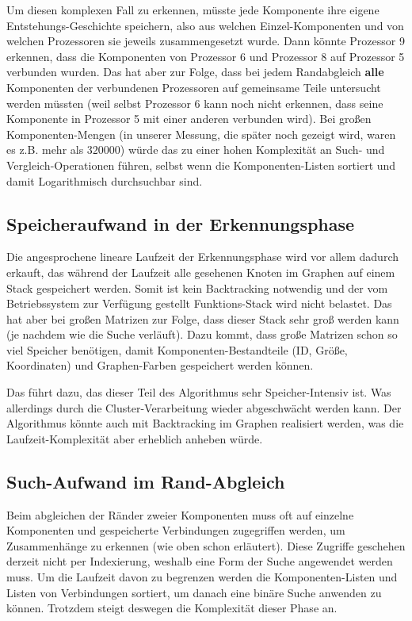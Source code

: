 Um diesen komplexen Fall zu erkennen, müsste jede Komponente ihre eigene Entstehungs-Geschichte speichern, also aus welchen Einzel-Komponenten und von welchen Prozessoren sie jeweils zusammengesetzt wurde. Dann könnte Prozessor 9 erkennen, dass die Komponenten von Prozessor 6 und Prozessor 8 auf Prozessor 5 verbunden wurden. Das hat aber zur Folge, dass bei jedem Randabgleich \textbf{alle} Komponenten der verbundenen Prozessoren auf gemeinsame Teile untersucht werden müssten (weil selbst Prozessor 6 kann noch nicht erkennen, dass seine Komponente in Prozessor 5 mit einer anderen verbunden wird). Bei großen Komponenten-Mengen (in unserer Messung, die später noch gezeigt wird, waren es z.B. mehr als $320000$) würde das zu einer hohen Komplexität an Such- und Vergleich-Operationen führen, selbst wenn die Komponenten-Listen sortiert und damit Logarithmisch durchsuchbar sind.

\subsection{Speicheraufwand in der Erkennungsphase}

Die angesprochene lineare Laufzeit der Erkennungsphase wird vor allem dadurch erkauft, das während der Laufzeit alle gesehenen Knoten im Graphen auf einem Stack gespeichert werden. Somit ist kein Backtracking notwendig und der vom Betriebssystem zur Verfügung gestellt Funktions-Stack wird nicht belastet. Das hat aber bei großen Matrizen zur Folge, dass dieser Stack sehr groß werden kann (je nachdem wie die Suche verläuft). Dazu kommt, dass große Matrizen schon so viel Speicher benötigen, damit Komponenten-Bestandteile (ID, Größe, Koordinaten) und Graphen-Farben gespeichert werden können.

Das führt dazu, das dieser Teil des Algorithmus sehr Speicher-Intensiv ist. Was allerdings durch die Cluster-Verarbeitung wieder abgeschwächt werden kann. Der Algorithmus könnte auch mit Backtracking im Graphen realisiert werden, was die Laufzeit-Komplexität aber erheblich anheben würde.

\subsection{Such-Aufwand im Rand-Abgleich}

Beim abgleichen der Ränder zweier Komponenten muss oft auf einzelne Komponenten und gespeicherte Verbindungen zugegriffen werden, um Zusammenhänge zu erkennen (wie oben schon erläutert). Diese Zugriffe geschehen derzeit nicht per Indexierung, weshalb eine Form der Suche angewendet werden muss. Um die Laufzeit davon zu begrenzen werden die Komponenten-Listen und Listen von Verbindungen sortiert, um danach eine binäre Suche anwenden zu können. Trotzdem steigt deswegen die Komplexität dieser Phase an.

